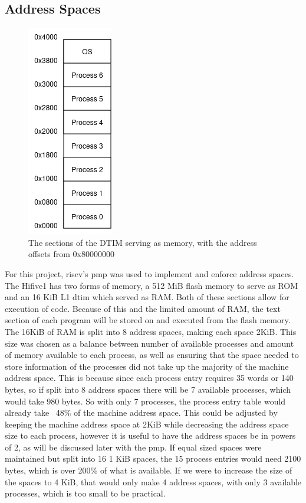 \subsection{Address Spaces}
\begin{figure}[H]
    \includegraphics[height=0.3\textheight]{figures/dtim.png}
    \centering
    \caption[Layout of memory]{The sections of the DTIM serving as memory, with the address offsets from 0x80000000}
\end{figure}
For this project, \gls{riscv}'s \ac{pmp} was used to implement and enforce address spaces. The Hifive1 has two forms of memory, a 512 MiB flash memory to serve as ROM and an 16 KiB L1 \ac{dtim} which served as RAM. Both of these sections allow for execution of code. Because of this and the limited amount of RAM, the text section of each program will be stored on and executed from the flash memory. The 16KiB of RAM is split into 8 address spaces, making each space 2KiB. This size was chosen as a balance between number of available processes and amount of memory available to each process, as well as ensuring that the space needed to store information of the processes did not take up the majority of the machine address space. This is because since each process entry requires 35 words or 140 bytes, so if split into 8 address spaces there will be 7 available processes, which would take 980 bytes. So with only 7 processes, the process entry table would already take ~48\% of the machine address space. This could be adjusted by keeping the machine address space at 2KiB while decreasing the address space size to each process, however it is useful to have the address spaces be in powers of 2, as will be discussed later with the \ac{pmp}. If equal sized spaces were maintained but split into 16 1 KiB spaces, the 15 process entries would need 2100 bytes, which is over 200\% of what is available. If we were to increase the size of the spaces to 4 KiB, that would only make 4 address spaces, with only 3 available processes, which is too small to be practical.
